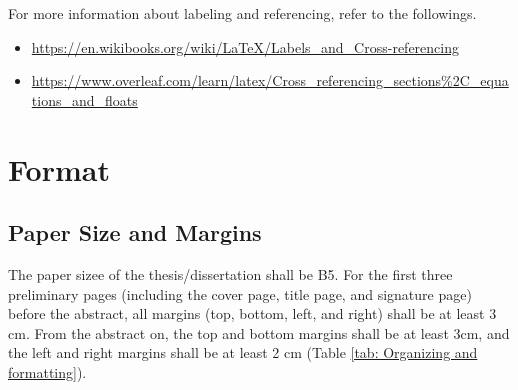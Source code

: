 \documentclass[11pt]{report}
\begin{document}
For more information about labeling and referencing, refer to the followings.
\begin{itemize}
\item
\url{https://en.wikibooks.org/wiki/LaTeX/Labels_and_Cross-referencing}
\item
\url{https://www.overleaf.com/learn/latex/Cross_referencing_sections%2C_equations_and_floats}
\end{itemize}

\chapter{Format}\label{chap:organizing}

\section{Paper Size and Margins} \label{sec:papersize}
The paper sizee of the thesis/dissertation shall be B5.
For the first three preliminary pages (including the cover page, title page, and signature page) before the abstract, all margins (top, bottom, left, and right) shall be at least 3 cm.
From the abstract on, the top and bottom margins shall be at least 3cm, and the left and right margins shall be at least 2 cm (Table \ref{tab: Organizing and formatting}).
\bigskip
\end{document}
